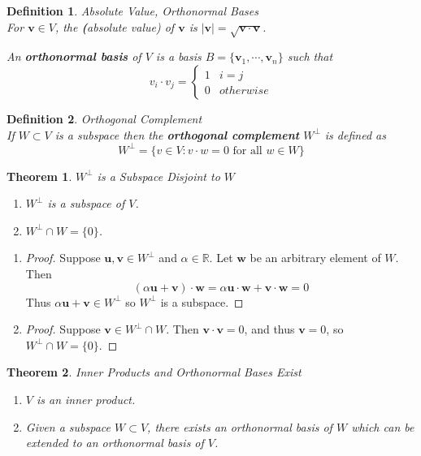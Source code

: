\documentclass[12pt]{article}
\newtheorem{thm}{Theorem}[section] %
\theoremstyle{plain}
\newtheorem{definition}{Definition}[section]
\newcommand{\R}{\mathbb{R}}
\newcommand{\vv}{\mathbf{v}}
\newcommand{\vu}{\mathbf{u}}
\newcommand{\vw}{\mathbf{w}}
\begin{document}
    \begin{definition}{Absolute Value, Orthonormal Bases}
        ~\\For $\vv \in V$, the \textbf(absolute value) of $\vv$ is $|\vv| = \sqrt{\vv \cdot \vv}$. 

        An \textbf{orthonormal basis} of $V$ is a basis $B = \{\vv_1, \cdots, \vv_n\}$ such that 
        \[
            v_i \cdot v_j = \begin{cases}
                1 & i = j\\
                0 & otherwise
            \end{cases}
        \]
    \end{definition}
    
    \begin{definition}{Orthogonal Complement}
        ~\\If $W \subset V$ is a subspace then the \textbf{orthogonal complement} $W^{\perp}$ is defined as $$W^{\perp} = \{v \in V: v\cdot w = 0 \text{ for all } w \in W\}$$
    \end{definition}

    \begin{thm}{$W^{\perp}$ is a Subspace Disjoint to $W$}
        \begin{enumerate}
            \item $W^{\perp}$ is a subspace of $V$.
            \item $W^{\perp} \cap W = \{0\}$.
        \end{enumerate}
    \end{thm}

    \begin{enumerate}
        \item \begin{proof}
            Suppose $\vu, \vv \in W^{\perp}$ and $\alpha \in \R$. Let $\vw$ be an arbitrary element of $W$. Then $$(\alpha\vu + \vv)\cdot \vw = \alpha \vu \cdot \vw + \vv \cdot \vw = 0$$Thus $\alpha\vu + \vv \in W^{\perp}$ so $W^{\perp}$ is a subspace.
        \end{proof}
        \item \begin{proof}
            Suppose $\vv \in W^{\perp} \cap W$. Then $\vv \cdot \vv = 0$, and thus $\vv = 0$, so $W^{\perp} \cap W = \{0\}$.
        \end{proof}
    \end{enumerate}

    \begin{thm}{Inner Products and Orthonormal Bases Exist}
        \begin{enumerate}
            \item $V$ is an inner product.
            \item Given a subspace $W \subset V$, there exists an orthonormal basis of $W$ which can be extended to an orthonormal basis of $V$.
        \end{enumerate}
    \end{thm}
\end{document}
